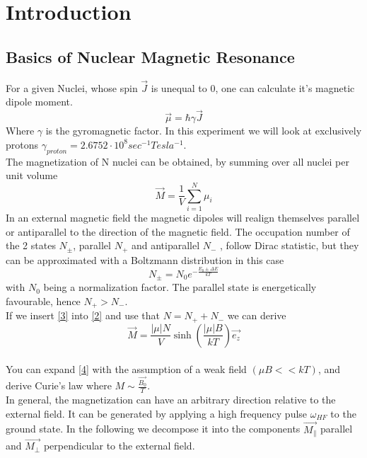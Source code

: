 \section{Introduction}\label{intro}
\subsection{Basics of Nuclear Magnetic Resonance}\label{basics}
For a given Nuclei, whose spin $\vec{J}$ is unequal to 0, one can calculate it's magnetic dipole moment. 
\begin{equation}
	\label{1}
	\vec{\mu} = \hbar \gamma \vec{J}
\end{equation}
Where $\gamma$ is the gyromagnetic factor. In this experiment we will look at exclusively protons $\gamma_{proton} = 2.6752 \cdot 10^8 sec^{-1} Tesla^{-1}$.
\vspace{5mm} \\
The magnetization of N nuclei can be obtained, by summing over all nuclei per unit volume
\begin{equation}
	\label{2}
	\vec{M} = \dfrac{1}{V} \sum^{N}_{i=1} \mu_i
\end{equation}
In an external magnetic field the magnetic dipoles will realign themselves parallel or antiparallel to the direction of the magnetic field. The occupation number of the 2 states $N_{\pm}$, parallel $N_{+}$ and antiparallel $N_{-}$ , follow Dirac statistic, but they can be approximated with a Boltzmann distribution in this case 
\begin{equation}
	\label{3}
	N_{\pm}=N_0 e^{-\frac{E_0 \pm \Delta E}{kT}}
\end{equation}
with $N_0$ being a normalization factor. The parallel state is energetically favourable, hence $N_{+} > N_{-}$. 
\vspace{3mm} \\
If we insert \eqref{3} into \eqref{2} and use that $N = N_+ + N_-$ we can derive
\begin{equation}
	\label{4}
	\vec M =\frac{|\mu| N}{V} \sinh(\frac{|\mu| B}{kT}) \vec{e_z}
\end{equation}\\
You can expand \eqref{4} with the assumption of a weak field $(\mu B << kT)$, and derive Curie's law where $M \sim \frac{\vec{B_{0}}}{T}$. 
\vspace{5mm} \\
In general, the magnetization can have an arbitrary direction relative to the external field. It can be generated by applying a high frequency pulse $\omega_{HF}$ to the ground state. In the following we decompose it into the components $\vec{M_{\parallel}}$ parallel and $\vec{M_{\perp}}$ perpendicular to the external field. 
